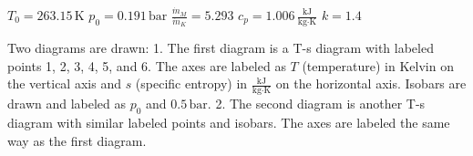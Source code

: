 \( T_0 = 263.15 \, \text{K} \)  
\( p_0 = 0.191 \, \text{bar} \)  
\( \frac{\dot{m}_M}{\dot{m}_K} = 5.293 \)  
\( c_p = 1.006 \, \frac{\text{kJ}}{\text{kg·K}} \)  
\( k = 1.4 \)  

Two diagrams are drawn:  
1. The first diagram is a T-s diagram with labeled points 1, 2, 3, 4, 5, and 6. The axes are labeled as \( T \) (temperature) in Kelvin on the vertical axis and \( s \) (specific entropy) in \( \frac{\text{kJ}}{\text{kg·K}} \) on the horizontal axis. Isobars are drawn and labeled as \( p_0 \) and \( 0.5 \, \text{bar} \).  
2. The second diagram is another T-s diagram with similar labeled points and isobars. The axes are labeled the same way as the first diagram.